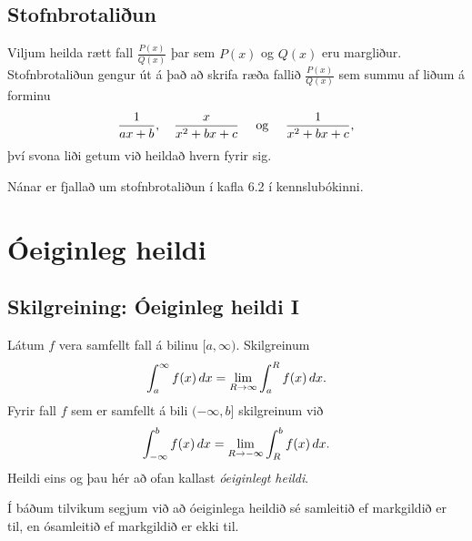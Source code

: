 \documentclass[a4paper,10pt,icelandic]{sphinxmanual}
\begin{document}

\subsection{Stofnbrotaliðun}
\label{kafli06:stofnbrotaliun}\label{kafli06:index-12}
Viljum heilda rætt fall \(\frac{P(x)}{Q(x)}\) þar sem \(P(x)\)
og \(Q(x)\) eru margliður. Stofnbrotaliðun gengur út á það að skrifa ræða fallið
\(\frac{P(x)}{Q(x)}\) sem summu af liðum á forminu
\begin{gather}
\begin{split}\frac{1}{ax+b}, \quad \frac{x}{x^2+bx+c} \quad\text{ og }\quad \frac{1}{x^2+bx+c},\end{split}\notag
\end{gather}
því svona liði getum við heildað hvern fyrir sig.

Nánar er fjallað um stofnbrotaliðun í kafla 6.2 í kennslubókinni.


\section{Óeiginleg heildi}
\label{kafli06:index-14}\label{kafli06:oeiginleg-heildi}

\subsection{Skilgreining: Óeiginleg heildi I}
\label{kafli06:skilgreining-oeiginleg-heildi-i}
Látum \(f\) vera samfellt fall á bilinu \([a, \infty)\).
Skilgreinum
\begin{gather}
\begin{split}\int_a^\infty f(x)\,dx=\lim_{R\rightarrow\infty} \int_a^R f(x)\,dx.\end{split}\notag
\end{gather}
Fyrir fall \(f\) sem er samfellt á bili \((-\infty, b]\)
skilgreinum við
\begin{gather}
\begin{split}\int_{-\infty}^b f(x)\,dx=\lim_{R\rightarrow-\infty} \int_R^b f(x)\,dx.\end{split}\notag
\end{gather}
Heildi eins og þau hér að ofan kallast \textit{óeiginlegt heildi}.

Í báðum tilvikum segjum við að óeiginlega heildið sé samleitið ef
markgildið er til, en ósamleitið ef markgildið er ekki til.
\end{document}
